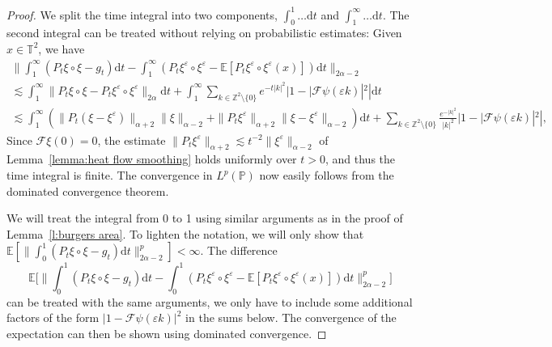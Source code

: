 \documentclass[11pt,a4paper]{article}
\newcommand{\mathd}{\mathrm{d}}
\theoremstyle{remark}
\newcommand{\Z}{\mathbb{Z}}
\newcommand{\E}{\mathbb{E}}
\newcommand{\CF}{\ensuremath{\mathscr{F}}}
\begin{document}
\begin{proof}
   We split the time integral into two components, $\int_0^1 \dots \mathd t$ and $\int_1^\infty \dots \mathd t$. The second integral can be treated without relying on probabilistic estimates: Given $x \in \mathbb{T}^2$, we have
   \begin{gather*}
      \bigg\| \int_1^\infty (P_t \xi \circ \xi - g_t) \mathd t - \int_1^\infty (P_t \xi^\varepsilon \circ \xi^\varepsilon - \E[P_t \xi^\varepsilon \circ \xi^\varepsilon(x)]) \mathd t \bigg\|_{2\alpha-2} \\
      \lesssim \int_1^\infty \| P_t \xi \circ \xi - P_t \xi^\varepsilon \circ \xi^\varepsilon \|_{2\alpha} \mathd t + \int_1^\infty \sum_{k \in \Z^2 \setminus\{0\}} e^{-t |k|^2} |1 - |\CF \psi(\varepsilon k)|^2| \mathd t \\
      \lesssim  \int_1^\infty (\| P_t (\xi - \xi^\varepsilon) \|_{\alpha + 2} \| \xi \|_{\alpha-2} + \| P_t \xi^\varepsilon \|_{\alpha + 2} \| \xi - \xi^\varepsilon \|_{\alpha - 2}) \mathd t + \sum_{k \in \Z^2 \setminus\{0\}} \frac{e^{- |k|^2}}{|k|^2} |1 - |\CF \psi(\varepsilon k)|^2|,
   \end{gather*}
   Since $\CF \xi (0) = 0$, the estimate $\| P_t \xi^\varepsilon \|_{\alpha + 2} \lesssim t^{-2} \| \xi^\varepsilon \|_{\alpha-2}$ of Lemma~\ref{lemma:heat flow smoothing} holds uniformly over $t > 0$, and thus the time integral is finite. The convergence in $L^p(\mathbb{P})$ now easily follows from the dominated convergence theorem.
   
   We will treat the integral from 0 to 1 using similar arguments as in the proof of Lemma~\ref{l:burgers area}. To lighten the notation, we will only show that $\E[\| \int_0^1 (P_t \xi \circ \xi - g_t) \mathd t\|_{2\alpha-2}^p]<\infty$. The difference
   \[
      \E\Big[ \Big\| \int_0^1 (P_t \xi \circ \xi - g_t) \mathd t - \int_0^1 (P_t \xi^\varepsilon \circ \xi^\varepsilon - \E[P_t \xi^\varepsilon \circ \xi^\varepsilon(x)]) \mathd t \Big\|_{2\alpha - 2}^p\Big]
   \]
   can be treated with the same arguments, we only have to include some additional factors of the form $|1 - \CF \psi (\varepsilon k)|^2$ in the sums below. The convergence of the expectation can then be shown using dominated convergence.
   

\end{proof}
\end{document}
